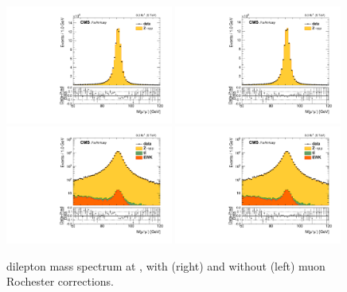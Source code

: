 \begin{figure}[htbp]
\centering
\includegraphics[width=0.49\textwidth]{plots/LepScaleSmear/plotZmm5TeV_noCorr/zmm.pdf}
\includegraphics[width=0.49\textwidth]{plots/LepScaleSmear/plotZmm5TeV_corr/zmm.pdf}
\\
\includegraphics[width=0.49\textwidth]{plots/LepScaleSmear/plotZmm5TeV_noCorr/zmmlog.pdf}
\includegraphics[width=0.49\textwidth]{plots/LepScaleSmear/plotZmm5TeV_corr/zmmlog.pdf}
\caption{\zmm dilepton mass spectrum at \sg, with (right) and without (left) muon Rochester corrections.}
\label{fig:lepscale:zmm:5}
\end{figure}